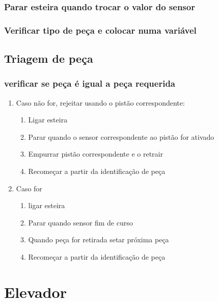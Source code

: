 \documentclass[11pt]{article}
\begin{document}
\subsubsection{Parar esteira quando trocar o valor do sensor}
\label{sec-1-2-3}
\subsubsection{Verificar tipo de peça e colocar numa variável}
\label{sec-1-2-4}
\subsection{Triagem de peça}
\label{sec-1-3}
\subsubsection{verificar se peça é igual a peça requerida}
\label{sec-1-3-1}
\begin{enumerate}
\item Caso não for, rejeitar usando o pistão correspondente:
\label{sec-1-3-1-1}
\begin{enumerate}
\item Ligar esteira
\item Parar quando o sensor correspondente ao pistão for ativado
\item Empurrar pistão correspondente e o retrair
\item Recomeçar a partir da identificação de peça
\end{enumerate}
\item Caso for
\label{sec-1-3-1-2}
\begin{enumerate}
\item ligar esteira
\item Parar quando sensor fim de curso
\item Quando peça for retirada setar próxima peça
\item Recomeçar a partir da identificação de peça
\end{enumerate}
\newpage
\end{enumerate}
\section{Elevador}
\label{sec-2}
\end{document}
